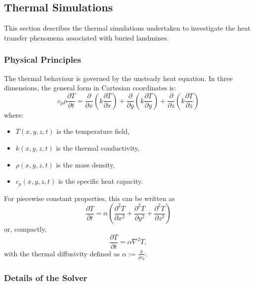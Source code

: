 \subsection{Thermal Simulations} \label{compvis_thermalsims}

    This section describes the thermal simulations undertaken to investigate the heat transfer phenomena associated with buried landmines.
    
    \subsubsection{Physical Principles}
    
        The thermal behaviour is governed by the unsteady heat equation. In three dimensions, the general form in Cartesian coordinates is:
        \begin{equation}
            c_p \rho \frac{\partial T}{\partial t} = 
            \frac{\partial}{\partial x} \left( k \frac{\partial T}{\partial x} \right) + 
            \frac{\partial}{\partial y} \left( k \frac{\partial T}{\partial y} \right) + 
            \frac{\partial}{\partial z} \left( k \frac{\partial T}{\partial z} \right)
        \end{equation}
        where:
        \begin{itemize}
            \item \( T(x,y,z,t) \) is the temperature field,
            \item \( k(x,y,z,t) \) is the thermal conductivity,
            \item \( \rho(x,y,z,t) \) is the mass density,
            \item \( c_p(x,y,z,t) \) is the specific heat capacity.
        \end{itemize}
        For piecewise constant properties, this can be written as
        \begin{equation}
            \frac{\partial T}{\partial t} = \alpha \left( \frac{\partial^2 T}{\partial x^2} + \frac{\partial^2 T}{\partial y^2} + \frac{\partial^2 T}{\partial z^2} \right)
        \end{equation}
        or, compactly,
        \begin{equation}
            \frac{\partial T}{\partial t} = \alpha \nabla^2 T,
        \end{equation}
        with the thermal diffusivity defined as \(\alpha := \frac{k}{\rho c_p}\).

    
    
    \subsubsection{Details of the Solver}
    
